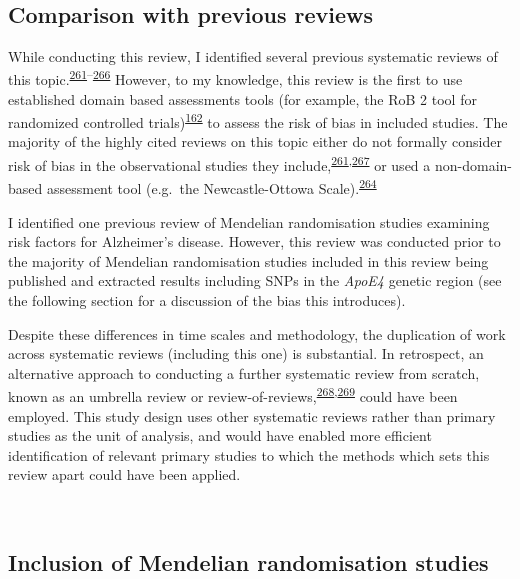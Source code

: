 \documentclass[a4paper, twoside]{templates/ociamthesis}
\begin{document}
~

\hypertarget{rev-previous-reviews}{%
\subsection{Comparison with previous reviews}\label{rev-previous-reviews}}

While conducting this review, I identified several previous systematic reviews of this topic.\textsuperscript{\protect\hyperlink{ref-chu2018}{261}--\protect\hyperlink{ref-kuzma2018risk}{266}} However, to my knowledge, this review is the first to use established domain based assessments tools (for example, the RoB 2 tool for randomized controlled trials)\textsuperscript{\protect\hyperlink{ref-sterne2019}{162}} to assess the risk of bias in included studies. The majority of the highly cited reviews on this topic either do not formally consider risk of bias in the observational studies they include,\textsuperscript{\protect\hyperlink{ref-chu2018}{261},\protect\hyperlink{ref-power2015}{267}} or used a non-domain-based assessment tool (e.g.~the Newcastle-Ottowa Scale).\textsuperscript{\protect\hyperlink{ref-poly2020}{264}}

I identified one previous review of Mendelian randomisation studies examining risk factors for Alzheimer's disease. However, this review was conducted prior to the majority of Mendelian randomisation studies included in this review being published and extracted results including SNPs in the \emph{ApoE4} genetic region (see the following section for a discussion of the bias this introduces).

Despite these differences in time scales and methodology, the duplication of work across systematic reviews (including this one) is substantial. In retrospect, an alternative approach to conducting a further systematic review from scratch, known as an umbrella review or review-of-reviews,\textsuperscript{\protect\hyperlink{ref-aromataris2015}{268},\protect\hyperlink{ref-smith2011}{269}} could have been employed. This study design uses other systematic reviews rather than primary studies as the unit of analysis, and would have enabled more efficient identification of relevant primary studies to which the methods which sets this review apart could have been applied.

~

\hypertarget{rev-discussion-MR}{%
\subsection{Inclusion of Mendelian randomisation studies}\label{rev-discussion-MR}}
\end{document}
